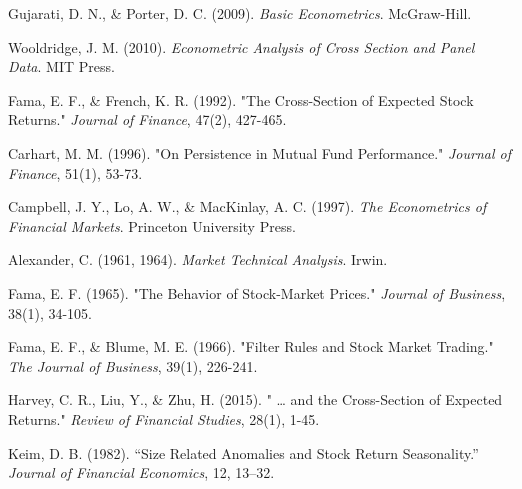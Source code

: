 \documentclass[14pt]{extarticle} %
\begin{document}
\begin{thebibliography}{99}

Gujarati, D. N., \& Porter, D. C. (2009). \textit{Basic Econometrics}. McGraw-Hill.

Wooldridge, J. M. (2010). \textit{Econometric Analysis of Cross Section and Panel Data}. MIT Press.

Fama, E. F., \& French, K. R. (1992). "The Cross-Section of Expected Stock Returns." \emph{Journal of Finance}, 47(2), 427-465.

Carhart, M. M. (1996). "On Persistence in Mutual Fund Performance." \emph{Journal of Finance}, 51(1), 53-73.

Campbell, J. Y., Lo, A. W., \& MacKinlay, A. C. (1997). \textit{The Econometrics of Financial Markets}. Princeton University Press.

Alexander, C. (1961, 1964). \textit{Market Technical Analysis}. Irwin.

Fama, E. F. (1965). "The Behavior of Stock-Market Prices." \emph{Journal of Business}, 38(1), 34-105.

Fama, E. F., \& Blume, M. E. (1966). "Filter Rules and Stock Market Trading." \emph{The Journal of Business}, 39(1), 226-241.

Harvey, C. R., Liu, Y., \& Zhu, H. (2015). " … and the Cross-Section of Expected Returns." \emph{Review of Financial Studies}, 28(1), 1-45.

Keim, D. B. (1982). “Size Related Anomalies and Stock Return Seasonality.” \emph{Journal of Financial Economics}, 12, 13–32.

\end{thebibliography}
\end{document}
